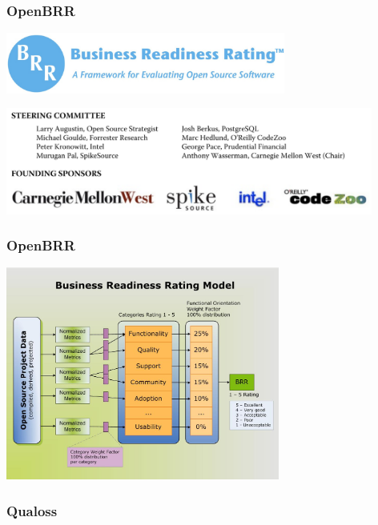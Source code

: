 \documentclass[17pt,aspectratio=169,hyperref=pdfusetitle]{beamer}
\begin{document}
\begin{frame}[fragile]
  \frametitle{OpenBRR}

  
  \begin{center}
  \includegraphics[height=2cm]{figs/openbrr}

  \includegraphics[height=3.5cm]{figs/openbrr-authors}
  \end{center}  
  
\end{frame}

\begin{frame}[fragile]
  \frametitle{OpenBRR}

  
  \begin{center}
  \includegraphics[height=7cm]{figs/openbrr-model}
  \end{center}  
  
\end{frame}


\begin{frame}[fragile]
  \frametitle{Qualoss}
  
\end{frame}
\end{document}
